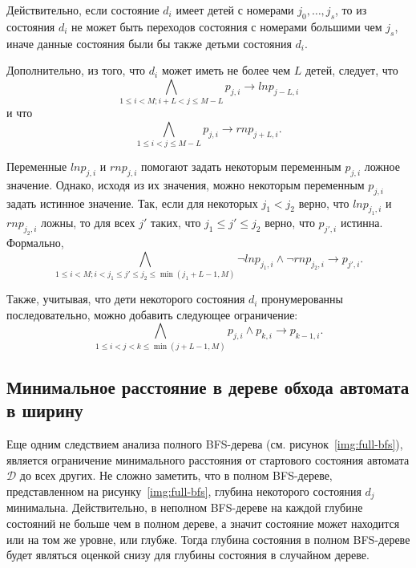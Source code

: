 Действительно, если состояние $d_{i}$ имеет детей с номерами $j_{0},\ldots,j_{s}$, то из состояния $d_{i}$ не может быть переходов состояния с номерами б\emph{о}льшими чем $j_{s}$, иначе данные состояния были бы также детьми состояния $d_{i}$. 

Дополнительно, из того, что $d_{i}$ может иметь не более чем $L$ детей, следует, что
\begin{equation*}
\bigwedge_{1 \leq i < M; i + L < j \leq M - L} p_{j,i} \rightarrow \mathit{lnp}_{j - L, i}
\end{equation*}
и что
\begin{equation*}
\bigwedge_{1 \leq i < j \leq M - L} p_{j,i} \rightarrow \mathit{rnp}_{j + L, i}.
\end{equation*}


Переменные $\mathit{lnp}_{j,i}$ и $\mathit{rnp}_{j,i}$ помогают задать некоторым переменным $p_{j,i}$ ложное значение.
Однако, исходя из их значения, можно некоторым переменным $p_{j,i}$ задать истинное значение.
Так, если для некоторых $j_{1} < j_{2}$ верно, что $\mathit{lnp}_{j_{1}, i}$ и $\mathit{rnp}_{j_{2}, i}$ ложны, то для всех $j'$ таких, что $j_{1} \leq j' \leq j_{2}$ верно, что $p_{j',i}$ истинна.
Формально,
\begin{equation*}
\bigwedge_{1 \leq i < M;i < j_{1} \leq j' \leq j_{2} \leq \min\left(j_{1} + L - 1, M\right)} \neg \mathit{lnp}_{j_{1},i} \wedge \neg \mathit{rnp}_{j_{2},i} \rightarrow p_{j',i}.
\end{equation*}


Также, учитывая, что дети некоторого состояния $d_{i}$ пронумерованны последовательно, можно добавить следующее ограничение:
\begin{equation*}
\bigwedge_{1 \leq i < j < k \leq \min(j + L - 1, M)} p_{j,i} \wedge p_{k,i} \rightarrow p_{k - 1, i}.
\end{equation*}



\subsection{Минимальное расстояние в дереве обхода автомата в ширину}
\label{sec:space:pruning:bfs-distance}

Еще одним следствием анализа полного BFS-дерева (см. рисунок~\ref{img:full-bfs}), является ограничение минимального расстояния от стартового состояния автомата $\mathcal{D}$ до всех других.
Не сложно заметить, что в полном BFS-дереве, представленном на рисунку~\ref{img:full-bfs}, глубина некоторого состояния $d_{j}$ минимальна.
Действительно, в неполном BFS-дереве на каждой глубине состояний не больше чем в полном дереве, а значит состояние может находится или на том же уровне, или глубже. 
Тогда глубина состояния в полном BFS-дереве будет являться оценкой снизу для глубины состояния в случайном дереве.


